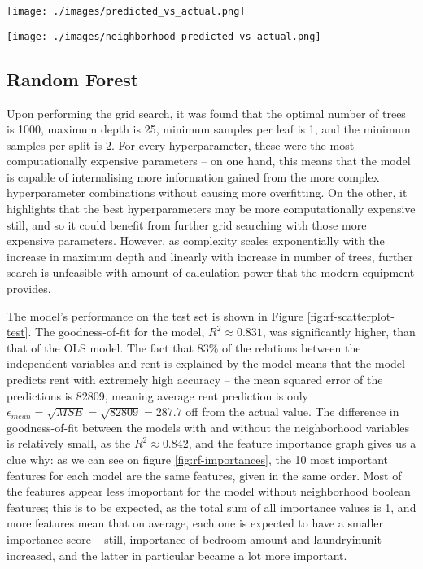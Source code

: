 \documentclass[12pt]{report}
\begin{document}
\begin{minipage}{0.5\textwidth}
	\centering
	\texttt{[image: ./images/predicted\_vs\_actual.png]}
	\label{fig:ols-scatterplot}
\end{minipage}
\begin{minipage}{0.5\textwidth}
	\centering
	\texttt{[image: ./images/neighborhood\_predicted\_vs\_actual.png]}
	\label{fig:ols-scatterplot-neighborhood}
\end{minipage}

\subsection{Random Forest}
Upon performing the grid search, it was found that the optimal number of trees is 1000, maximum depth is 25, minimum samples per leaf is 1, and the minimum samples per split is 2. For every hyperparameter, these were the most computationally expensive parameters -- on one hand, this means that the model is capable of internalising more information  gained from the more complex hyperparameter combinations without causing more overfitting. On the other, it highlights that the best hyperparameters may be more computationally expensive still, and so it could benefit from further grid searching with those more expensive parameters. However, as complexity scales exponentially with the increase in maximum depth and linearly with increase in number of trees, further search is unfeasible with amount of calculation power that the modern equipment provides.

The model's performance on the test set is shown in Figure \ref{fig:rf-scatterplot-test}. The goodness-of-fit for the model, $R^2\approx0.831$, was significantly higher, than that of the OLS model. The fact that 83\% of the relations between the independent variables and rent is explained by the model means that the model predicts rent with extremely high accuracy -- the mean squared error of the predictions is 82809, meaning average rent prediction is only $\epsilon_{mean}=\sqrt{MSE}=\sqrt{82809}=287.7$ off from the actual value. The difference in goodness-of-fit between the models with and without the neighborhood variables is relatively small, as the $R^2\approx0.842$, and the feature importance graph gives us a clue why: as we can see on figure \ref{fig:rf-importances}, the 10 most important features for each model are the same features, given in the same order. Most of the features appear less imoportant for the model without neighborhood boolean features; this is to be expected, as the total sum of all importance values is 1, and more features mean that on average, each one is expected to have a smaller importance score -- still, importance of bedroom amount and laundry\textunderscore in\textunderscore unit increased, and the latter in particular became a lot more important.
\end{document}
